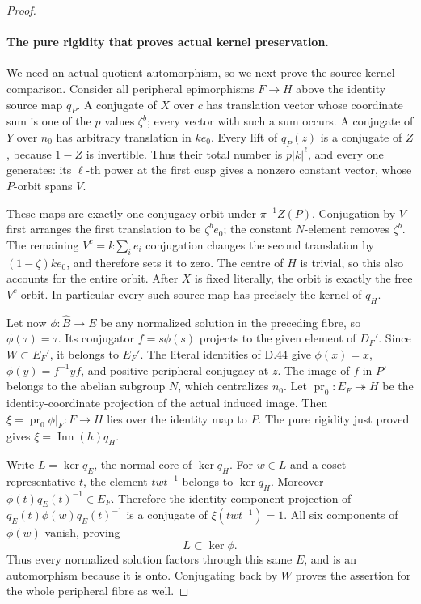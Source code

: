 \begin{proof}
\paragraph{The pure rigidity that proves actual kernel preservation.}
We need an actual quotient automorphism, so we next prove
the source-kernel comparison.
Consider all peripheral epimorphisms \(F\to H\) above
the identity source map \(q_P\). A conjugate of \(X\)
over \(c\) has translation vector whose coordinate sum
is one of the \(p\) values \(\zeta^b\); every vector
with such a sum occurs. A conjugate of \(Y\) over
\(n_0\) has arbitrary translation in \(k e_0\).
Every lift of \(q_P(z)\) is a conjugate of \(Z\),
because \(1-Z\) is invertible. Thus their total number
is \(p|k|^\ell\), and every one generates: its
\(\ell\)-th power at the first cusp gives a nonzero
constant vector, whose \(P\)-orbit spans \(V\).

These maps are exactly one conjugacy orbit under
\(\pi^{-1}Z(P)\). Conjugation by \(V\) first arranges
the first translation to be \(\zeta^b e_0\); the
constant \(N\)-element removes \(\zeta^b\).
The remaining \(V^c=k\sum_i e_i\) conjugation changes
the second translation by \((1-\zeta)k e_0\), and
therefore sets it to zero. The centre of \(H\) is
trivial, so this also accounts for the entire orbit.
After \(X\) is fixed literally, the orbit is exactly
the free \(V^c\)-orbit. In particular every such source
map has precisely the kernel of \(q_H\).

Let now \(\phi:\widehat B\to E\) be any normalized
solution in the preceding fibre, so \(\phi(\tau)=\tau\).
Its conjugator \(f=s\phi(s)\) projects to the given
element of \(D_F'\). Since \(W\subset E_F'\),
it belongs to \(E_F'\). The literal identities of D.44
give \(\phi(x)=x\), \(\phi(y)=f^{-1}yf\), and
positive peripheral conjugacy at \(z\).
The image of \(f\) in \(P'\) belongs to the abelian
subgroup \(N\), which centralizes \(n_0\).
Let \(\operatorname{pr}_0:E_F\twoheadrightarrow H\)
be the identity-coordinate projection of the actual
induced image. Then
\(\xi=\operatorname{pr}_0\phi|_F:F\to H\) lies over the identity
map to \(P\). The pure rigidity just proved gives
\(\xi=\operatorname{Inn}(h)q_H\).

Write \(L=\ker q_E\), the normal core of \(\ker q_H\).
For \(w\in L\) and a coset representative \(t\),
the element \(twt^{-1}\) belongs to \(\ker q_H\).
Moreover \(\phi(t)q_E(t)^{-1}\in E_F\). Therefore
the identity-component projection of
\(q_E(t)\phi(w)q_E(t)^{-1}\) is a conjugate of
\(\xi(twt^{-1})=1\).
All six components of \(\phi(w)\) vanish, proving
\[
                L\subset\ker\phi.
 \tag{D.46.13}
\]
Thus every normalized solution factors through this
same \(E\), and is an automorphism because it is onto.
Conjugating back by \(W\) proves the assertion for the
whole peripheral fibre as well.


\end{proof}
